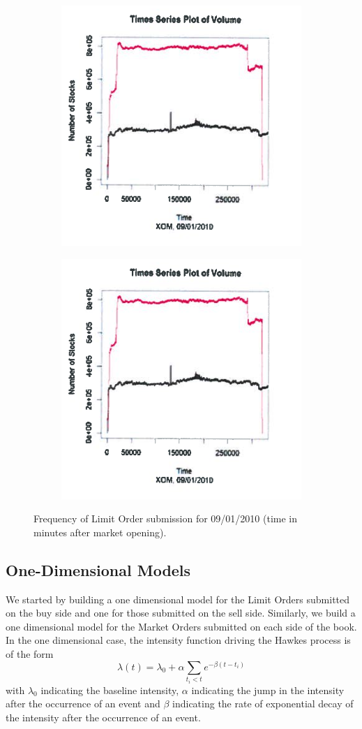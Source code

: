 	\begin{figure}
	\centering
	\begin{subfigure}
	  \centering
	  \includegraphics[width=.4\linewidth]{chapters/chapter_el_exch/figures/timevol1.png}
	\end{subfigure}%
	\begin{subfigure}
	  \centering
	  \includegraphics[width=.4\linewidth]{chapters/chapter_el_exch/figures/timevol1.png}
	\end{subfigure}
	\caption{Frequency of Limit Order submission for 09/01/2010 (time in minutes after market opening). \label{fig:freqsubmit2}}
	\end{figure}


\subsection{One-Dimensional Models}


We started by building a one dimensional model for the Limit Orders submitted on the buy side and one for those submitted on the sell side. Similarly, we build a one dimensional model for the Market Orders submitted on each side of the book. In the one dimensional case, the intensity function driving the Hawkes process is of the form
	\begin{equation}\label{eqn:lambda6}
	\lambda(t)= \lambda_0 + \alpha \sum_{t_i<t} e^{-\beta(t-t_i)}
	\end{equation}
with $\lambda_0$ indicating the baseline intensity, $\alpha$ indicating the jump in the intensity after the occurrence of an event and $\beta$ indicating the rate of exponential decay of the intensity after the occurrence of an event.


